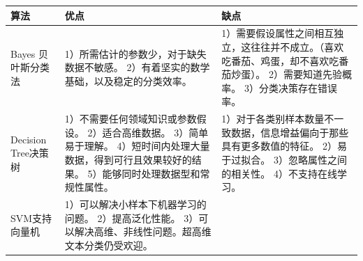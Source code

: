 \begin{longtable}[]{lll}
\toprule
\begin{minipage}[b]{0.04\columnwidth}
  \raggedright
  \strut
  算法
  \strut
\end{minipage}
&
\begin{minipage}[b]{0.04\columnwidth}
  \raggedright
  \strut
  优点
  \strut
\end{minipage}
&
\begin{minipage}[b]{0.04\columnwidth}
  \raggedright
  \strut
  缺点
  \strut
\end{minipage}
\tabularnewline
\midrule
\endhead
\begin{minipage}[t]{0.04\columnwidth}
  \raggedright
  \strut
  Bayes 贝叶斯分类法
  \strut
\end{minipage}
&
\begin{minipage}[t]{0.04\columnwidth}
  \raggedright
  \strut
  1）所需估计的参数少，对于缺失数据不敏感。
  2）有着坚实的数学基础，以及稳定的分类效率。
  \strut
\end{minipage}
&
\begin{minipage}[t]{0.04\columnwidth}
  \raggedright
  \strut
  1）需要假设属性之间相互独立，这往往并不成立。（喜欢吃番茄、鸡蛋，却不喜欢吃番茄炒蛋）。
  2）需要知道先验概率。
  3）分类决策存在错误率。
  \strut
\end{minipage}
\tabularnewline
\begin{minipage}[t]{0.04\columnwidth}
  \raggedright
  \strut
  Decision Tree决策树
  \strut
\end{minipage}
&
\begin{minipage}[t]{0.04\columnwidth}
  \raggedright
  \strut
  1）不需要任何领域知识或参数假设。
  2）适合高维数据。
  3）简单易于理解。
  4）短时间内处理大量数据，得到可行且效果较好的结果。
  5）能够同时处理数据型和常规性属性。
  \strut
\end{minipage}
&
\begin{minipage}[t]{0.04\columnwidth}
  \raggedright
  \strut
  1）对于各类别样本数量不一致数据，信息增益偏向于那些具有更多数值的特征。
  2）易于过拟合。
  3）忽略属性之间的相关性。
  4）不支持在线学习。
  \strut
\end{minipage}
\tabularnewline
\begin{minipage}[t]{0.04\columnwidth}
  \raggedright
  \strut
  SVM支持向量机
  \strut
\end{minipage}
&
\begin{minipage}[t]{0.04\columnwidth}
  \raggedright
  \strut
  1）可以解决小样本下机器学习的问题。
  2）提高泛化性能。
  3）可以解决高维、非线性问题。超高维文本分类仍受欢迎。

\end{minipage}
\end{longtable}
